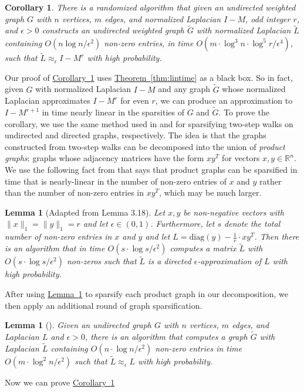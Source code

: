 \documentclass[11pt]{article}
\numberwithin{equation}{section}
\newtheorem{lemma}[theorem]{Lemma}
\newtheorem{corollary}[theorem]{Corollary}
\theoremstyle{definition}
\theoremstyle{plain}
\newcommand{\expref}[2]{\hyperref[#2]{#1~\ref{#2}}}
\newcommand{\wt}{\widetilde}   %
\numberwithin{myalgctr}{section}
\theoremstyle{named}
\begin{document}
\begin{corollary}
\label{cor:lintime}
There is a randomized algorithm that given an undirected weighted graph $G$ with $n$ vertices, $m$ edges, and normalized Laplacian $I-M$, \emph{odd} integer $r$, and $\epsilon>0$ constructs an undirected weighted graph $\wt{G}$ with normalized Laplacian $\wt{L}$ containing $O(n\log n/\epsilon^2)$ non-zero entries, in time $O(m\cdot \log^3 n\cdot \log^5 r/\epsilon^4)$, such that $\wt{L}\approx_{\epsilon}I-M^r$ with high probability.
\end{corollary}

Our proof of \expref{Corollary}{cor:lintime} uses \expref{Theorem}{thm:lintime} as a black box. So in fact, given $G$ with normalized Laplacian $I-M$ and any graph $\wt{G}$ whose normalized Laplacian approximates $I-M^r$ for even $r$, we can produce an approximation to $I-M^{r+1}$ in time nearly linear in the sparsities of $G$ and $\wt{G}$. To prove the corollary, we use the same method used in \cite{PS13} and \cite{CKPPRSV16} for sparsifying two-step walks on undirected and directed graphs, respectively. The idea is that the graphs constructed from two-step walks can be decomposed into the union of \emph{product graphs}: graphs whose adjacency matrices have the form $xy^{T}$ for vectors $x,y\in\mathbb{R}^n$. We use the following fact from \cite{CKPPRSV16} that says that product graphs can be sparsified in time that is nearly-linear in the number of non-zero entries of $x$ and $y$ rather than the number of non-zero entries in $xy^{T}$, which may be much larger. 


\begin{lemma}[Adapted from \cite{CKPPRSV16} Lemma 3.18]
\label{lem:sparsifyproduct}
Let $x,y$ be non-negative vectors with $\|x\|_1=\|y\|_1=r$ and let $\epsilon\in(0,1)$. Furthermore, let $s$ denote the total number of non-zero entries in $x$ and $y$ and let $L=\mathrm{diag}(y)-\frac{1}{r}\cdot xy^T$. Then there is an algorithm that in time $O(s\cdot\log s/\epsilon^2)$ computes a matrix $\wt{L}$ with $O(s\cdot\log s/\epsilon^2)$ non-zeros such that $\wt{L}$ is a directed $\epsilon$-approximation of $L$ with high probability.
\end{lemma}

After using \expref{Lemma}{lem:sparsifyproduct} to sparsify each product graph in our decomposition, we then apply an additional round of graph sparsification.

\begin{lemma}[\cite{KPPS16}]
\label{lem:st}
Given an undirected graph $G$ with $n$ vertices, $m$ edges, and Laplacian $L$ and $\epsilon>0$, there is an algorithm that computes a graph $\wt{G}$ with Laplacian $\wt{L}$ containing $O(n\cdot\log n/\epsilon^2)$ non-zero entries in time $O(m\cdot \log^2 n/\epsilon^2)$ such that $\wt{L}\approx_{\epsilon}L$ with high probability. 
\end{lemma}
Now we can prove \expref{Corollary}{cor:lintime}
\end{document}
